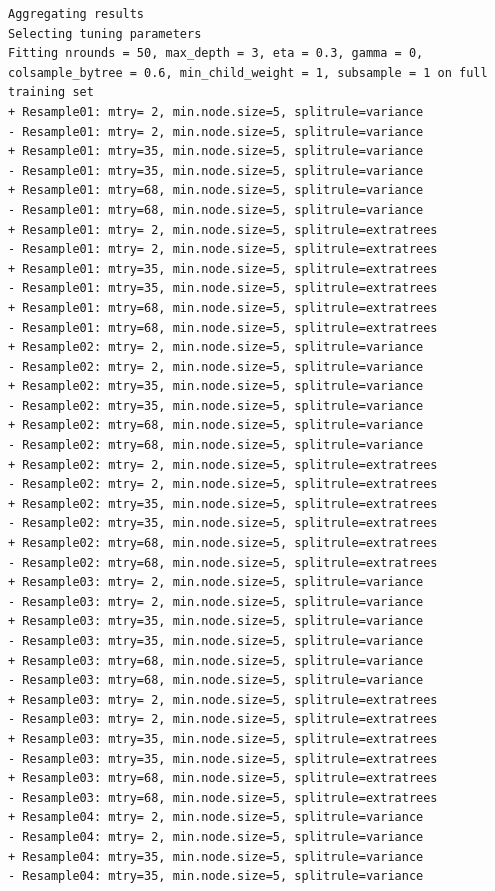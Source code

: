 \documentclass[
  letterpaper,
  DIV=11,
  numbers=noendperiod]{scrartcl}
\begin{document}
\begin{verbatim}
Aggregating results
Selecting tuning parameters
Fitting nrounds = 50, max_depth = 3, eta = 0.3, gamma = 0, colsample_bytree = 0.6, min_child_weight = 1, subsample = 1 on full training set
+ Resample01: mtry= 2, min.node.size=5, splitrule=variance 
- Resample01: mtry= 2, min.node.size=5, splitrule=variance 
+ Resample01: mtry=35, min.node.size=5, splitrule=variance 
- Resample01: mtry=35, min.node.size=5, splitrule=variance 
+ Resample01: mtry=68, min.node.size=5, splitrule=variance 
- Resample01: mtry=68, min.node.size=5, splitrule=variance 
+ Resample01: mtry= 2, min.node.size=5, splitrule=extratrees 
- Resample01: mtry= 2, min.node.size=5, splitrule=extratrees 
+ Resample01: mtry=35, min.node.size=5, splitrule=extratrees 
- Resample01: mtry=35, min.node.size=5, splitrule=extratrees 
+ Resample01: mtry=68, min.node.size=5, splitrule=extratrees 
- Resample01: mtry=68, min.node.size=5, splitrule=extratrees 
+ Resample02: mtry= 2, min.node.size=5, splitrule=variance 
- Resample02: mtry= 2, min.node.size=5, splitrule=variance 
+ Resample02: mtry=35, min.node.size=5, splitrule=variance 
- Resample02: mtry=35, min.node.size=5, splitrule=variance 
+ Resample02: mtry=68, min.node.size=5, splitrule=variance 
- Resample02: mtry=68, min.node.size=5, splitrule=variance 
+ Resample02: mtry= 2, min.node.size=5, splitrule=extratrees 
- Resample02: mtry= 2, min.node.size=5, splitrule=extratrees 
+ Resample02: mtry=35, min.node.size=5, splitrule=extratrees 
- Resample02: mtry=35, min.node.size=5, splitrule=extratrees 
+ Resample02: mtry=68, min.node.size=5, splitrule=extratrees 
- Resample02: mtry=68, min.node.size=5, splitrule=extratrees 
+ Resample03: mtry= 2, min.node.size=5, splitrule=variance 
- Resample03: mtry= 2, min.node.size=5, splitrule=variance 
+ Resample03: mtry=35, min.node.size=5, splitrule=variance 
- Resample03: mtry=35, min.node.size=5, splitrule=variance 
+ Resample03: mtry=68, min.node.size=5, splitrule=variance 
- Resample03: mtry=68, min.node.size=5, splitrule=variance 
+ Resample03: mtry= 2, min.node.size=5, splitrule=extratrees 
- Resample03: mtry= 2, min.node.size=5, splitrule=extratrees 
+ Resample03: mtry=35, min.node.size=5, splitrule=extratrees 
- Resample03: mtry=35, min.node.size=5, splitrule=extratrees 
+ Resample03: mtry=68, min.node.size=5, splitrule=extratrees 
- Resample03: mtry=68, min.node.size=5, splitrule=extratrees 
+ Resample04: mtry= 2, min.node.size=5, splitrule=variance 
- Resample04: mtry= 2, min.node.size=5, splitrule=variance 
+ Resample04: mtry=35, min.node.size=5, splitrule=variance 
- Resample04: mtry=35, min.node.size=5, splitrule=variance 

\end{verbatim}
\end{document}
